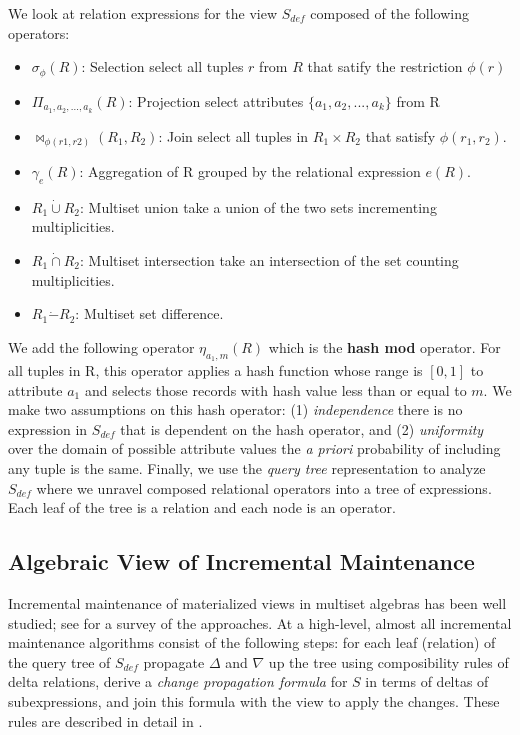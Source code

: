 We look at relation expressions for the view $S_{def}$ composed of the following operators:
\begin{itemize}\vspace{-.45em}
\item $\sigma_{\phi}(R)$: Selection select all tuples $r$ from $R$ that satify the restriction $\phi (r)$ \vspace{-.45em}
\item $\Pi_{a_1,a_2,...,a_k}(R)$: Projection select attributes $\{a_1,a_2,...,a_k\}$ from R \vspace{-.45em}
\item $\bowtie_{\phi (r1,r2)}(R_1,R_2)$: Join select all tuples in $R_1 \times R_2$ that satisfy $\phi (r_1,r_2)$.
\item $\gamma_{e}(R)$: Aggregation of R grouped by the relational expression $e(R)$.\vspace{-.45em}
\item $R_1 \dot{\cup} R_2$: Multiset union take a union of the two sets incrementing multiplicities.
\item $R_1 \dot{\cap} R_2$: Multiset intersection take an intersection of the set counting multiplicities.
\item $R_1 \dot{-} R_2$: Multiset set difference.
\end{itemize}
We add the following operator $\eta_{a_1, m}(R)$ which is the \textbf{hash mod} operator.
For all tuples in R, this operator applies a hash function whose range is $[0,1]$ to attribute $a_1$ and selects those records with hash value less than or equal to $m$.
We make two assumptions on this hash operator: (1) \emph{independence} there is no expression in $S_{def}$ that is dependent on the hash operator, and (2) \emph{uniformity} over the domain of possible attribute values the \emph{a priori} probability of including any tuple is the same.
Finally, we use the \emph{query tree} representation to analyze $S_{def}$ where we unravel composed relational operators into a tree of expressions.
Each leaf of the tree is a relation and each node is an operator.

\subsection{Algebraic View of Incremental Maintenance}\label{subsec-inc}
Incremental maintenance of materialized views in multiset algebras has been well studied; see \cite{chirkova2011materialized} for a survey of the approaches. 
At a high-level, almost all incremental maintenance algorithms consist of the following steps: for each leaf (relation) of the query tree of $S_{def}$ propagate $\Delta$ and $\nabla$ up the tree using composibility rules of delta relations, derive a \emph{change propagation formula} for $S$ in terms of deltas of subexpressions, and join this formula with the view to apply the changes.
These rules are described in detail in \cite{DBLP:journals/vldb/KochAKNNLS14, DBLP:conf/pods/Koch10}.

